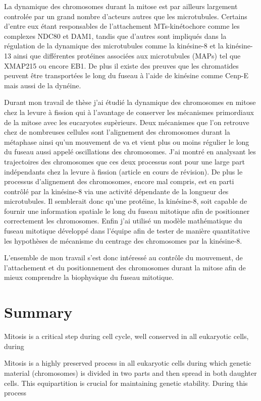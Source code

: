 \documentclass[12pt,a4paper,twoside,openright]{book}
\begin{document}
La dynamique des chromosomes durant la mitose est par ailleurs largement
controlée par un grand nombre d'acteurs autres que les microtubules.
Certains d'entre eux étant responsables de l'attachement MTs-kinétochore
comme les complexes NDC80 et DAM1, tandis que d'autres sont impliqués
dans la régulation de la dynamique des microtubules comme la kinésine-8
et la kinésine-13 ainsi que différentes protéines associées aux
microtubules (MAPs) tel que XMAP215 ou encore EB1. De plus il existe des
preuves que les chromatides peuvent être transportées le long du fuseau
à l'aide de kinésine comme Cenp-E mais aussi de la dynéine.

Durant mon travail de thèse j'ai étudié la dynamique des chromosomes en
mitose chez la levure à fission qui à l'avantage de conserver les
mécanismes primordiaux de la mitose avec les eucaryotes supèrieurs. Deux
mécanismes que l'on retrouve chez de nombreuses cellules sont
l'alignement des chromosomes durant la métaphase ainsi qu'un mouvement
de va et vient plus ou moins régulier le long du fuseau aussi appelé
oscillations des chromosomes. J'ai montré en analysant les trajectoires
des chromosomes que ces deux processus sont pour une large part
indépendants chez la levure à fission (article en cours de révision). De
plus le processus d'alignement des chromosomes, encore mal compris, est
en parti contrôlé par la kinésine-8 via une activité dépendante de la
longueur des microtubules. Il semblerait donc qu'une protéine, la
kinésine-8, soit capable de fournir une information spatiale le long du
fuseau mitotique afin de positionner correctement les chromosomes. Enfin
j'ai utilisé un modèle mathématique du fuseau mitotique développé dans
l'équipe afin de tester de manière quantitative les hypothèses de
mécanisme du centrage des chromosomes par la kinésine-8.

L'ensemble de mon travail s'est donc intéressé au contrôle du mouvement,
de l'attachement et du positionnement des chromosomes durant la mitose
afin de mieux comprendre la biophysique du fuseau mitotique.

\chapter{Summary}\label{summary}

Mitosis is a critical step during cell cycle, well conserved in all
eukaryotic cells, during

Mitosis is a highly preserved process in all eukaryotic cells during
which genetic material (chromosomes) is divided in two parts and then
spread in both daughter cells. This equipartition is crucial for
maintaining genetic stability. During this process
\end{document}
